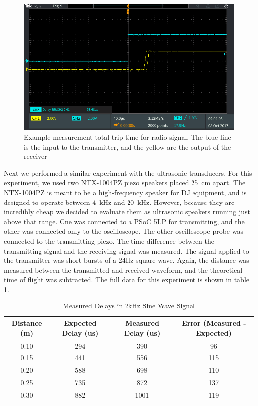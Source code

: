 \documentclass{article}
\begin{document}
    \begin{figure}[H]
      \centering
      \includegraphics[scale=0.2]{./images/rf_delay_ex.PNG}
      \caption{Example measurement total trip time for radio signal. The blue line is the input to the transmitter, and the yellow are the output of the receiver}
      \label{fig:rf_delay_ex}
    \end{figure}

    Next we performed a similar experiment with the ultrasonic transducers. For this experiment, we used two NTX-1004PZ piezo speakers placed \SI{25}{\centi\meter} apart. The NTX-1004PZ is meant to be a high-frequency speaker for DJ equipment, and is designed to operate between \SI{4}{\kilo\hertz} and \SI{20}{\kilo\hertz}. However, because they are incredibly cheap we decided to evaluate them as ultrasonic speakers running just above that range. One was connected to a PSoC 5LP for transmitting, and the other was connected only to the oscilloscope. The other oscilloscope probe was connected to the transmitting piezo. The time difference between the transmitting signal and the receiving signal was measured. The signal applied to the transmitter was short bursts of a 24Hz square wave. Again, the distance was measured between the transmitted and received waveform, and the theoretical time of flight was subtracted. The full data for this experiment is shown in table \ref{table:us_delay}.

    \begin{table}[H]
      \centering
      \begin{tabular}{|c|c|c|c|}\hline
        Distance (m) & Expected Delay (us) & Measured Delay (us) & Error (Measured - Expected) \\ \hline
        0.10 & 294 &  390 &  96 \\ \hline
        0.15 & 441 &  556 & 115 \\ \hline
        0.20 & 588 &  698 & 110 \\ \hline
        0.25 & 735 &  872 & 137 \\ \hline
        0.30 & 882 & 1001 & 119 \\ \hline
      \end{tabular}
      \caption{Measured Delays in 2kHz Sine Wave Signal}
      \label{table:us_delay}
    \end{table}
\end{document}
